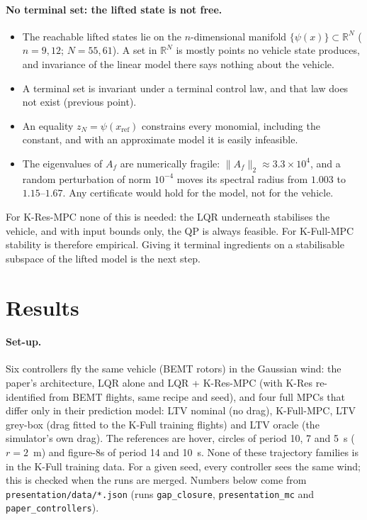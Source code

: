 \documentclass[11pt,a4paper]{article}
\newcommand{\KRes}{\textsf{K-Res}}            %
\newcommand{\KFull}{\textsf{K-Full}}          %
\newcommand{\KResMPC}{\textsf{K-Res-MPC}}     %
\newcommand{\KFullMPC}{\textsf{K-Full-MPC}}   %
\begin{document}
	\paragraph{No terminal set: the lifted state is not free.}
	\begin{itemize}[leftmargin=*]
		\item The reachable lifted states lie on the $n$-dimensional manifold
		$\{\psi(x)\} \subset \mathbb{R}^N$ ($n = 9, 12$; $N = 55, 61$). A set in $\mathbb{R}^N$ is
		mostly points no vehicle state produces, and invariance of the linear model there says nothing
		about the vehicle.
		\item A terminal set is invariant under a terminal control law, and that law does not exist
		(previous point).
		\item An equality $z_N = \psi(x_{\text{ref}})$ constrains every monomial, including the constant,
		and with an approximate model it is easily infeasible.
		\item The eigenvalues of $A_f$ are numerically fragile: $\|A_f\|_2 \approx 3.3\times10^{4}$, and a
		random perturbation of norm $10^{-4}$ moves its spectral radius from $1.003$ to $1.15$--$1.67$.
		Any certificate would hold for the model, not for the vehicle.
	\end{itemize}
	For \KResMPC{} none of this is needed: the LQR underneath stabilises the vehicle, and with input
	bounds only, the QP is always feasible. For \KFullMPC{} stability is therefore empirical. Giving it
	terminal ingredients on a stabilisable subspace of the lifted model is the next step.

	\section{Results}
	\label{sec:results}

	\paragraph{Set-up.} Six controllers fly the same vehicle (BEMT rotors) in the Gaussian wind:
	the paper's architecture, LQR alone and LQR + \KResMPC{} (with \KRes{} re-identified from
	BEMT flights, same recipe and seed), and four full MPCs that differ only in their prediction
	model: LTV nominal (no drag), \KFullMPC{}, LTV grey-box (drag fitted to the \KFull{} training
	flights) and LTV oracle (the simulator's own drag). The references are hover, circles of period
	10, 7 and 5~s ($r = 2$~m) and figure-8s of period 14 and 10~s. None of these trajectory families
	is in the \KFull{} training data. For a given seed, every controller sees the same wind; this is
	checked when the runs are merged. Numbers below come from \texttt{presentation/data/*.json}
	(runs \texttt{gap\_closure}, \texttt{presentation\_mc} and \texttt{paper\_controllers}).
\end{document}
